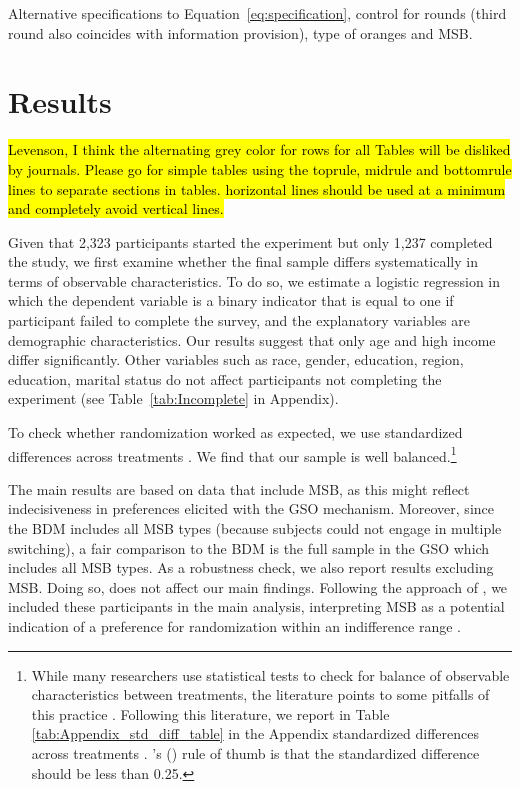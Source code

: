 \documentclass[12pt]{article}
\newcommand\citeapos[1]{\citeauthor{#1}'s (\citeyear{#1})} %
\begin{document}
Alternative specifications to Equation~\ref{eq:specification}, control for rounds (third round also coincides with information provision), type of oranges and MSB.

\section{Results}
\label{Results}
\hl{Levenson, I think the alternating grey color for rows for all Tables will be disliked by journals. Please go for simple tables using the toprule, midrule and bottomrule lines to separate sections in tables. horizontal lines should be used at a minimum and completely avoid vertical lines.}

Given that 2,323 participants started the experiment but only 1,237 completed the study, we first examine whether the final sample differs systematically in terms of observable characteristics. To do so, we estimate a logistic regression in which the dependent variable is a binary indicator that is equal to one if participant failed to complete the survey, and the explanatory variables are demographic characteristics. Our results suggest that only age and high income differ significantly. Other variables such as race, gender, education, region, education, marital status do not affect participants not completing the experiment (see Table~\ref{tab:Incomplete} in Appendix).

To check whether randomization worked as expected, we use standardized differences across treatments \citep{CochranRubin1973}. We find that our sample is well balanced.\footnote{While many researchers use statistical tests to check for balance of observable characteristics between treatments, the literature points to some pitfalls of this practice \citep[e.g.,][]{canavari2019run,DeatonCartwright2016,BrizEtAl2017,HoEtAl2007,MoherEtAl2010,MutzPemantle2015}. Following this literature, we report in Table \ref{tab:Appendix_std_diff_table} in the Appendix standardized differences across treatments \citep{ImbensRubin2016,ImbensWooldridge2009}. \citeapos{CochranRubin1973} rule of thumb is that the standardized difference should be less than 0.25. }


The main results are based on data that include MSB, as this might reflect indecisiveness in preferences elicited with the GSO mechanism. Moreover, since the BDM includes all MSB types (because subjects could not engage in multiple switching), a fair comparison to the BDM is the full sample in the GSO which includes all MSB types. As a robustness check, we also report results excluding MSB. Doing so, does not affect our main findings. Following the approach of \citet{brown2018separated}, we included these participants in the main analysis, interpreting MSB as a potential indication of a preference for randomization within an indifference range \citep{agranov2023stable}. 
\end{document}
